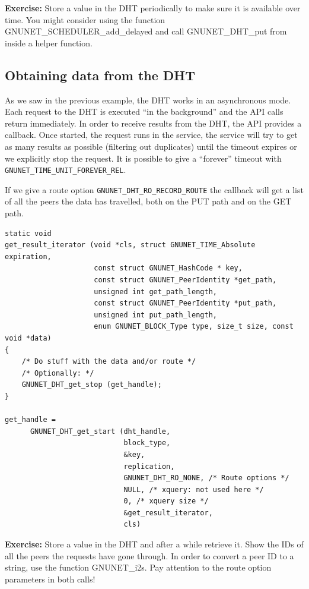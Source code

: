 \documentclass[10pt]{article}
\newcommand{\exercise}[1]{\noindent\begin{boxedminipage}{\textwidth}{\bf Exercise:} #1 \end{boxedminipage}}
\begin{document}
\exercise{Store a value in the DHT periodically to make sure it is available
over time. You might consider using the function GNUNET\_SCHEDULER\_add\_delayed and
call GNUNET\_DHT\_put from inside a helper function.}


\subsection{Obtaining data from the DHT}
As we saw in the previous example, the DHT works in an asynchronous mode.
Each request to the DHT is executed ``in the background'' and the API
calls return immediately. In order to receive results from the DHT, the
API provides a callback. Once started, the request runs in the service,
the service will try to get as many results as possible (filtering out
duplicates) until the timeout expires or we explicitly stop the request.
It is possible to give a ``forever'' timeout with
{\tt GNUNET\_TIME\_UNIT\_FOREVER\_REL}.

If we give a route option {\tt GNUNET\_DHT\_RO\_RECORD\_ROUTE} the callback
will get a list of all the peers the data has travelled, both on the PUT
path and on the GET path.
\lstset{language=C}
\begin{lstlisting}
static void
get_result_iterator (void *cls, struct GNUNET_TIME_Absolute expiration,
                     const struct GNUNET_HashCode * key,
                     const struct GNUNET_PeerIdentity *get_path,
                     unsigned int get_path_length,
                     const struct GNUNET_PeerIdentity *put_path,
                     unsigned int put_path_length,
                     enum GNUNET_BLOCK_Type type, size_t size, const void *data)
{
    /* Do stuff with the data and/or route */
    /* Optionally: */
    GNUNET_DHT_get_stop (get_handle);
}

get_handle =
      GNUNET_DHT_get_start (dht_handle,
                            block_type,
                            &key,
                            replication,
                            GNUNET_DHT_RO_NONE, /* Route options */
                            NULL, /* xquery: not used here */
                            0, /* xquery size */
                            &get_result_iterator,
                            cls)
\end{lstlisting}

\exercise{Store a value in the DHT and after a while retrieve it. Show the IDs of all 
the peers the requests have gone through. In order to convert a peer ID to a string, use
the function GNUNET\_i2s. Pay attention to the route option parameters in both calls!}
\end{document}
